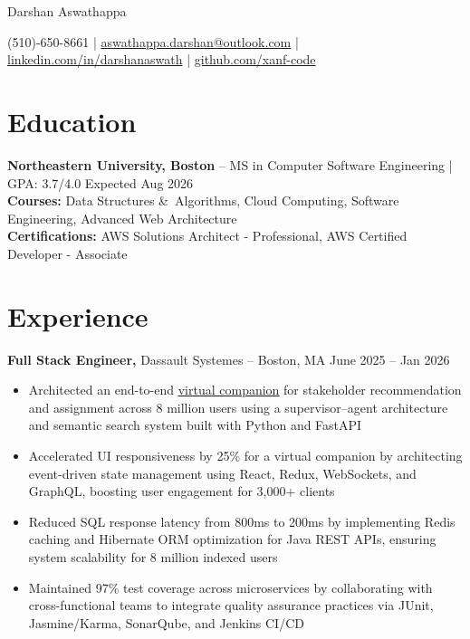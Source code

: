 \documentclass[11pt]{article}       %
\begin{document}
\centerline{\Huge Darshan Aswathappa}

\vspace{5pt}

\centerline{(510)-650-8661 | \href{mailto:aswathappa.darshan@outlook.com}{aswathappa.darshan@outlook.com} | \href{https://www.linkedin.com/in/darshanaswath/}{linkedin.com/in/darshanaswath} | \href{https://github.com/xanf-code}{github.com/xanf-code}}

\vspace{-10pt}

\section*{Education}
\textbf{Northeastern University, Boston} -- MS in Computer Software Engineering | GPA: 3.7/4.0 
\hfill Expected Aug 2026 \\
\vspace{3px}
\textbf{Courses:} Data Structures \&\ Algorithms, Cloud Computing, Software Engineering, Advanced Web Architecture \\
\vspace{3px}
\textbf{Certifications:} AWS Solutions Architect - Professional, AWS Certified Developer - Associate
\vspace{-6.5pt}

\section*{Experience}

\textbf{Full Stack Engineer,} {Dassault Systemes} -- Boston, MA \hfill June 2025 -- Jan 2026 \\
\vspace{-9pt}
\begin{itemize}
    \item Architected an end-to-end \uline{\href{https://www.3ds.com/newsroom/press-releases/dassault-systemes-unveils-new-way-working-industry-ai-powered-virtual-companions}{virtual companion}} for stakeholder recommendation and assignment across 8 million users using a supervisor–agent architecture and semantic search system built with Python and FastAPI
    \item Accelerated UI responsiveness by 25\% for a virtual companion by architecting event-driven state management using React, Redux, WebSockets, and GraphQL, boosting user engagement for 3,000+ clients
    \item Reduced SQL response latency from 800ms to 200ms by implementing Redis caching and Hibernate ORM optimization for Java REST APIs, ensuring system scalability for 8 million indexed users
    \item Maintained 97\% test coverage across microservices by collaborating with cross-functional teams to integrate quality assurance practices via JUnit, Jasmine/Karma, SonarQube, and Jenkins CI/CD
\end{itemize}
\end{document}
